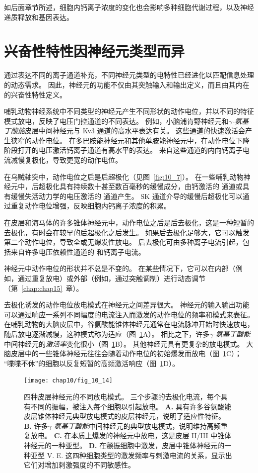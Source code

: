 如后面章节所述，细胞内钙离子浓度的变化也会影响多种细胞代谢过程，以及神经递质释放和基因表达。



\section{兴奋性特性因神经元类型而异}

通过表达不同的离子通道补充，不同神经元类型的电特性已经进化以匹配信息处理的动态需求。
因此，神经元的功能不仅由其突触输入和输出定义，而且由其内在的兴奋性特性定义。


哺乳动物神经系统中不同类型的神经元产生不同形状的动作电位，并以不同的特征模式放电，反映了电压门控通道的不同表达。
例如，小脑浦肯野神经元和\textit{$\gamma$-氨基丁酸能}皮层中间神经元与 Kv3 通道的高水平表达有关。
这些通道的快速激活会产生狭窄的动作电位。
在多巴胺能神经元和其他单胺能神经元中，在动作电位下降阶段打开的电压激活钙离子通道有高水平的表达。
来自这些通道的内向钙离子电流减慢复极化，导致更宽的动作电位。


在乌贼轴突中，动作电位之后是后超极化（见图~\ref{fig:10_7}）。
在一些哺乳动物神经元中，后超极化具有持续数十甚至数百毫秒的缓慢成分，由钙激活的  通道或具有缓慢失活动力学的电压激活的  通道产生。
SK 通道介导的缓慢后超极化可以通过重复动作电位增强，反映细胞内钙离子浓度的积累。


在皮层和海马体的许多锥体神经元中，动作电位之后是后去极化，这是一种短暂的去极化，有时会在较早的后超极化之后发生。
如果后去极化足够大，它可以触发第二个动作电位，导致全或无爆发性放电。
后去极化可由多种离子电流引起，包括来自许多电压依赖性通道的  和钙离子电流。


神经元中动作电位的形状并不总是不变的。
在某些情况下，它可以在内部（例如，通过重复放电）或外部（例如，通过突触调制）进行动态调节（第~\ref{chap:chap15}~章）。


去极化诱发的动作电位放电模式在神经元之间差异很大。 
神经元的输入输出功能可以通过响应一系列不同幅度的电流注入而激发的动作电位的频率和模式来表征。
在哺乳动物的大脑皮层中，谷氨酸能锥体神经元通常在电流脉冲开始时快速放电，随后放电逐渐减慢，这种模式称为适应（图~\ref{fig:10_14}A）。
相比之下，许多\textit{$\gamma$-氨基丁酸能}中间神经元的\textit{激活率}变化很小（图~\ref{fig:10_14}B）。
其他神经元具有更复杂的放电模式。
大脑皮层中的一些锥体神经元往往会随着动作电位的初始爆发而放电（图~\ref{fig:10_14}C）；
“喋喋不休”的细胞以反复短暂的高频激活响应（图~\ref{fig:10_14}D）。


\begin{figure}[htbp]
	\centering
	\texttt{[image: chap10/fig\_10\_14]}
	\caption{四种皮层神经元的不同放电模式。
		三个步骤的去极化电流，每个具有不同的振幅，被注入每个细胞以引起放电\cite{nowak2003electrophysiological}。
		\textbf{A.} 具有许多谷氨酸能皮层锥体神经元典型放电模式的皮层神经元，说明了适应性特征。
		\textbf{B.} 许多\textit{$\gamma$-氨基丁酸能}中间神经元的典型放电模式，说明维持高频重复放电。
		\textbf{C.} 在本质上爆发的神经元中放电，这是皮层 II/III 中锥体神经元的一种亚型。
		\textbf{D.} 在颤振细胞中激发，皮层中锥体神经元的一种亚型 V. E. 这四种细胞类型的激发频率与刺激电流的关系，显示出它们对增加刺激强度的不同敏感性。}
	\label{fig:10_14}
\end{figure}


